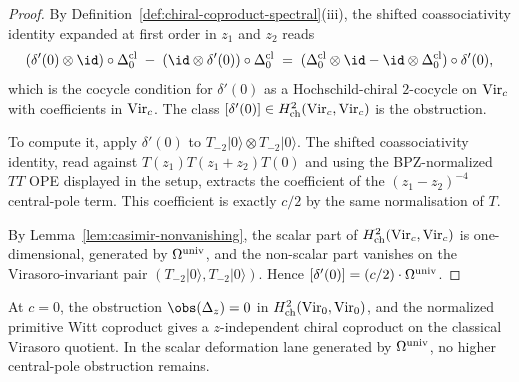 \begin{proof}
By Definition~\ref{def:chiral-coproduct-spectral}(iii), the shifted
coassociativity identity expanded at first order in $z_{1}$ and
$z_{2}$ reads
\[
(\delta'(0) \otimes \id) \circ \Delta_{0}^{\mathrm{cl}}
\;-\;
(\id \otimes \delta'(0)) \circ \Delta_{0}^{\mathrm{cl}}
\;=\;
(\Delta_{0}^{\mathrm{cl}} \otimes \id - \id \otimes \Delta_{0}^{\mathrm{cl}})
\circ \delta'(0),
\]
which is the cocycle condition for $\delta'(0)$ as a
Hochschild-chiral $2$-cocycle on $\mathrm{Vir}_{c}$ with coefficients in
$\mathrm{Vir}_{c}$. The class
$[\delta'(0)] \in H^{2}_{\mathrm{ch}}(\mathrm{Vir}_{c}, \mathrm{Vir}_{c})$ is the obstruction.

To compute it, apply $\delta'(0)$ to $T_{-2}|0\rangle \otimes
T_{-2}|0\rangle$. The shifted coassociativity identity, read against
$T(z_{1}) T(z_{1} + z_{2}) T(0)$ and using the BPZ-normalized $TT$ OPE
displayed in the setup, extracts the coefficient of the
$(z_{1} - z_{2})^{-4}$ central-pole term. This coefficient is exactly
$c/2$ by the same normalisation of $T$.

By Lemma~\ref{lem:casimir-nonvanishing}, the scalar part of
$H^{2}_{\mathrm{ch}}(\mathrm{Vir}_{c}, \mathrm{Vir}_{c})$ is one-dimensional, generated by $\Omega^{\mathrm{univ}}$, and
the non-scalar part vanishes on the Virasoro-invariant pair
$(T_{-2}|0\rangle, T_{-2}|0\rangle)$. Hence $[\delta'(0)] =
(c/2) \cdot \Omega^{\mathrm{univ}}$.
\end{proof}

\begin{theorem}[Coproduct is constant at $c = 0$]
\label{thm:c-zero-coproduct-is-constant}
\ClaimStatusProvedHere
At $c = 0$, the obstruction
$\obs(\Delta_{z}) = 0$ in $H^{2}_{\mathrm{ch}}(\mathrm{Vir}_{0}, \mathrm{Vir}_{0})$,
and the normalized primitive Witt coproduct gives a $z$-independent
chiral coproduct on the classical Virasoro quotient. In the scalar
deformation lane generated by $\Omega^{\mathrm{univ}}$, no higher central-pole
obstruction remains.
\end{theorem}

